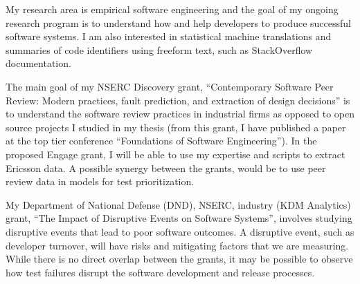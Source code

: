 \documentclass[12pt, letterpaper]{article}
\begin{document}
\fancyhead{}
\pagestyle{fancy}
\renewcommand{\headrulewidth}{0pt}

\begin{center}
\begin{LARGE}
\noindent
{}
\end{LARGE}
\end{center}


My research area is empirical software engineering and the goal of my ongoing
research program is to understand how and help developers to produce successful
software systems. I am also interested in statistical machine translations and
summaries of code identifiers using freeform text, such as StackOverflow
documentation.

The main goal of my NSERC Discovery grant, “Contemporary Software Peer Review:
Modern practices, fault prediction, and extraction of design decisions” is to
understand the software review practices in industrial firms as opposed to open
source projects I studied in my thesis (from this grant, I have published a
paper at the top tier conference “Foundations of Software Engineering”). 
%
In the proposed Engage grant, I will be able to use my expertise and scripts to
extract Ericsson data. A possible synergy between the grants, would be to use
peer review data in models for test prioritization. 

My Department of National Defense (DND), NSERC, industry (KDM Analytics) grant,
“The Impact of Disruptive Events on Software Systems”, involves studying
disruptive events that lead to poor software outcomes. A disruptive event, such
as developer turnover, will have risks and mitigating factors that we are
measuring. 
%
While there is no direct overlap between the grants, it may be possible to
observe how test failures disrupt the software development and release
processes.
\end{document}
